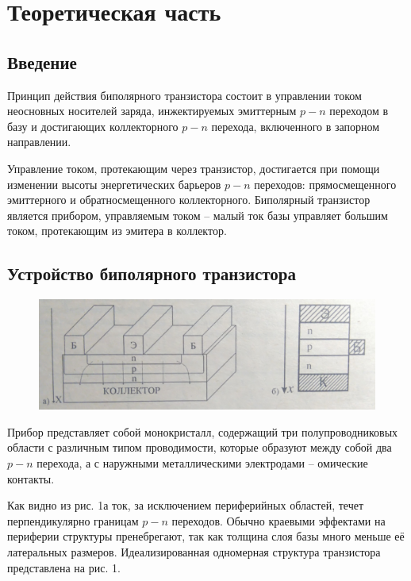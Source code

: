

\def\labauthors{Есюнин Д.В., Есюнин М.В.}
\def\labgroup{440}
\def\labnumber{2}
\def\labtheme{Измерение статических характеристик биполярного транзистора}

\newpage
\section{Теоретическая часть}%
\subsection{Введение}%


Принцип действия биполярного транзистора состоит в управлении током неосновных носителей заряда, инжектируемых эмиттерным $p-n$ переходом
в базу и достигающих коллекторного $p-n$ перехода, включенного в запорном направлении. 

Управление током, протекающим через транзистор, достигается при помощи изменении высоты энергетических барьеров $p-n$ переходов:
прямосмещенного эмиттерного и обратносмещенного коллекторного. Биполярный транзистор является прибором, управляемым током -- малый ток
базы управляет большим током, протекающим из эмитера в коллектор.

\subsection{Устройство биполярного транзистора}%
\begin{figure}[h]
    \centering
    \includegraphics[width=\linewidth]{fig/1.jpg}
    \caption{}
    \label{fig:}
\end{figure}
Прибор представляет собой монокристалл, содержащий три полупроводниковых области с различным типом проводимости, которые
образуют между собой два $p-n$ перехода, а с наружными металлическими электродами -- омические контакты.

Как видно из рис. 1а ток, за исключением периферийных областей, течет перпендикулярно границам $p-n$ переходов. Обычно краевыми эффектами
на периферии структуры пренебрегают, так как толщина слоя базы много меньше её латеральных размеров. Идеализированная одномерная структура транзистора представлена на рис. 1.

